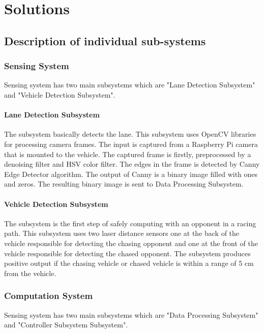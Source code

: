 \documentclass[a4paper,12pt]{article}
\begin{document}
\section{Solutions}

	\subsection{Description of individual sub-systems}

	\subsubsection{Sensing System}

		Sensing system has two main subsystems which are "Lane Detection Subsystem" and "Vehicle Detection Subsystem".
		
		\paragraph{Lane Detection Subsystem}
			The subsystem basically detects the lane. This subsystem uses OpenCV libraries for processing camera frames. The input is captured from a Raspberry Pi camera that is mounted to the vehicle. The captured frame is firstly, preprocessed by a denoising filter and HSV color filter. The edges in the frame is detected by Canny Edge Detector algorithm. The output of Canny is a binary image filled with ones and zeros. The resulting binary image is sent to Data Processing Subsystem.

		\paragraph{Vehicle Detection Subsystem}
			The subsystem is the first step of safely computing with an opponent in a racing path. This subsystem uses two laser distance sensors one at the back of the vehicle responsible for detecting the chasing opponent and one at the front of the vehicle responsible for detecting the chased opponent. The subsystem produces positive output if the chasing vehicle or chased vehicle is within a range of 5 cm from the vehicle.			

	\subsubsection{Computation System}
		
		Sensing system has two main subsystems which are "Data Processing Subsystem" and "Controller Subsystem Subsystem".
	
\end{document}
